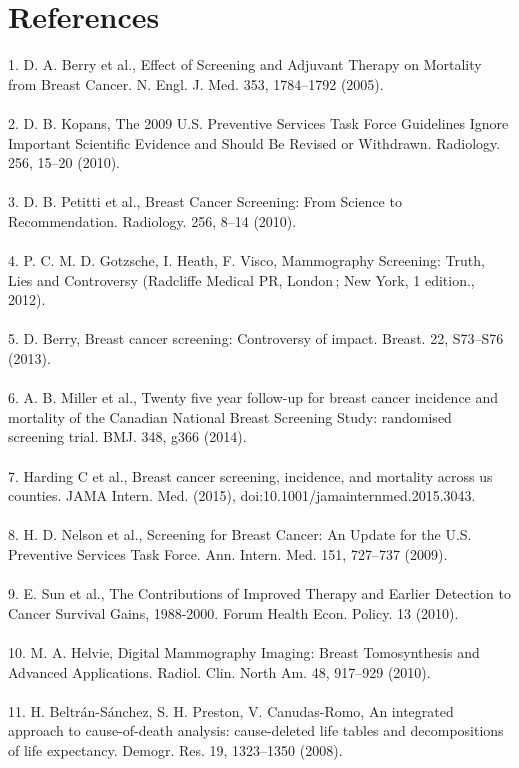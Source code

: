 \documentclass[11pt,letterpaper]{article}
\theoremstyle{plain}
\theoremstyle{remark}
\numberwithin{equation}{section}
\begin{document}
\section*{References}
1. 	D. A. Berry et al., Effect of Screening and Adjuvant Therapy
on Mortality from Breast Cancer. N. Engl. J. Med. 353, 1784–1792
(2005).\\\\
2. 	D. B. Kopans, The 2009 U.S. Preventive Services Task Force Guidelines Ignore Important Scientific Evidence and Should Be Revised or Withdrawn. Radiology. 256, 15–20 (2010).\\\\
3. 	D. B. Petitti et al., Breast Cancer Screening: From Science to Recommendation. Radiology. 256, 8–14 (2010).\\\\
4. 	P. C. M. D. Gotzsche, I. Heath, F. Visco, Mammography Screening: Truth, Lies and Controversy (Radcliffe Medical PR, London ; New York, 1 edition., 2012).\\\\
5. 	D. Berry, Breast cancer screening: Controversy of impact. Breast. 22, S73–S76 (2013).\\\\
6. 	A. B. Miller et al., Twenty five year follow-up for breast cancer incidence and mortality of the Canadian National Breast Screening Study: randomised screening trial. BMJ. 348, g366 (2014).\\\\
7. 	Harding C et al., Breast cancer screening, incidence, and mortality across us counties. JAMA Intern. Med. (2015), doi:10.1001/jamainternmed.2015.3043.\\\\
8. 	H. D. Nelson et al., Screening for Breast Cancer: An Update for the U.S. Preventive Services Task Force. Ann. Intern. Med. 151, 727–737 (2009).\\\\
9. 	E. Sun et al., The Contributions of Improved Therapy and Earlier Detection to Cancer Survival Gains, 1988-2000. Forum Health Econ. Policy. 13 (2010). \\\\
10. 	M. A. Helvie, Digital Mammography Imaging: Breast Tomosynthesis and Advanced Applications. Radiol. Clin. North Am. 48, 917–929 (2010).\\\\
11. 	H. Beltrán-Sánchez, S. H. Preston, V. Canudas-Romo, An integrated approach to cause-of-death analysis: cause-deleted life tables and decompositions of life expectancy. Demogr. Res. 19, 1323–1350 (2008).\\\\
\end{document}
